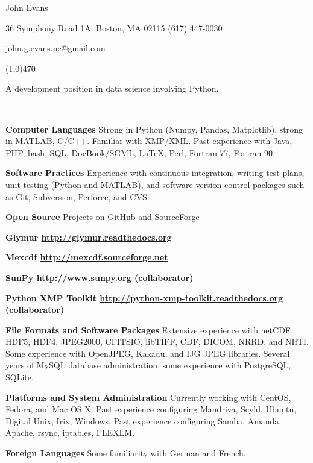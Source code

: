 \documentclass[11pt]{article}  %
\begin{document}
 
\centerline{{\Huge \sc John Evans}  }   %
\centerline{36 Symphony Road 1A. \textbullet \hspace{5pt}  Boston, MA  02115 \textbullet \hspace{5pt}  (617) 447-0030} 
\centerline{john.g.evans.ne@gmail.com} 
\noindent
\line(1,0){470}  \\


A development position in data science involving Python.

\bigskip %
\\ 
\begin{compactitem}
  \item {\bf Computer Languages} Strong in Python (Numpy, Pandas, Matplotlib),
    strong in MATLAB, C/C++.  Familiar with XMP/XML.  Past experience with Java,
    PHP, bash, SQL, DocBook/SGML, \LaTeX, Perl, Fortran 77, Fortran 90.
  \item {\bf Software Practices} Experience with continuous integration, writing
    test plans, unit testing (Python and MATLAB), and software version control
    packages such as Git, Subversion, Perforce, and CVS.
  \item {\bf Open Source} Projects on GitHub and SourceForge
    \begin{compactitem}
      \item \bf{Glymur} \url{http://glymur.readthedocs.org}
      \item \bf{Mexcdf} \url{http://mexcdf.sourceforge.net}
      \item \bf{SunPy} \url{http://www.sunpy.org} (collaborator)
      \item \bf{Python XMP Toolkit}
        \url{http://python-xmp-toolkit.readthedocs.org} (collaborator)
    \end{compactitem}
  \item {\bf File Formats and Software Packages} Extensive experience with netCDF,
    HDF5, HDF4, JPEG2000, CFITSIO, libTIFF, CDF, DICOM, NRRD, and NIfTI.  Some
    experience with OpenJPEG, Kakadu, and IJG JPEG libraries.  Several years of
    MySQL database administration, some experience with PostgreSQL, SQLite.
  \item {\bf Platforms and System Administration} Currently working with CentOS,
    Fedora, and Mac OS X.  Past experience configuring Mandriva, Scyld, Ubuntu,
    Digital Unix, Irix, Windows.  Past experience configuring Samba, Amanda,
    Apache, rsync, iptables, FLEXLM.
  \item {\bf Foreign Languages} Some familiarity with German and French.
\end{compactitem}
\end{document}
